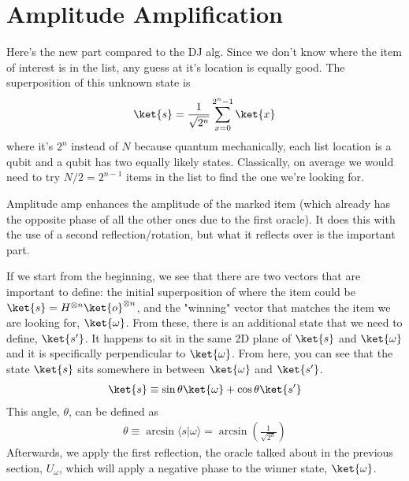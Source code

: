 \documentclass[preprint,aps,prd,nofootinbib,superscriptaddress]{revtex4-2}
\newcommand{\BraKet}[2]{\langle #1 | #2 \rangle}
\begin{document}
\section{Amplitude Amplification}
%
Here's the new part compared to the DJ alg. Since we don't know where the item of interest is in the list, any guess at it's location is equally good. The superposition of this unknown state is
%
\begin{eqnarray}
\ket{s} = \frac{1}{\sqrt{2^n}}\sum \limits _{x = 0} ^{2^n-1} \ket{x}
\end{eqnarray} 
%
where it's $2^n$ instead of $N$ because quantum mechanically, each list location is a qubit and a qubit has two equally likely states. Classically, on average we would need to try $N/2 = 2^{n-1}$ items in the list to find the one we're looking for.
%

%
Amplitude amp enhances the amplitude of the marked item (which already has the opposite phase of all the other ones due to the first oracle). It does this with the use of a second reflection/rotation, but what it reflects over is the important part. 
%

%
If we start from the beginning, we see that there are two vectors that are important to define: the initial superposition of where the item could be $\ket{s} = H^{\otimes n}\ket{o}^{\otimes n}$, and the "winning" vector that matches the item we are looking for, $\ket{\omega}$. From these, there is an additional state that we need to define, $\ket{s^\prime}$. It happens to sit in the same 2D plane of $\ket{s}$ and $\ket{\omega}$ and it is specifically perpendicular to $\ket{\omega}$. From here, you can see that the state $\ket{s}$ sits somewhere in between $\ket{\omega}$ and $\ket{s^\prime}$. 
%
\begin{eqnarray}
\ket{s} \equiv \sin\theta\ket{\omega} + \cos\theta \ket{s^\prime}
\end{eqnarray}
%
This angle, $\theta$, can be defined as
%
\begin{eqnarray}
\theta \equiv \arcsin\BraKet{s}{\omega} = \arcsin\left(\frac{1}{\sqrt{2^n}} \right)
\end{eqnarray}
%
Afterwards, we apply the first reflection, the oracle talked about in the previous section, $U_\omega$, which will apply a negative phase to the winner state, $\ket{\omega}$.
%
\end{document}
